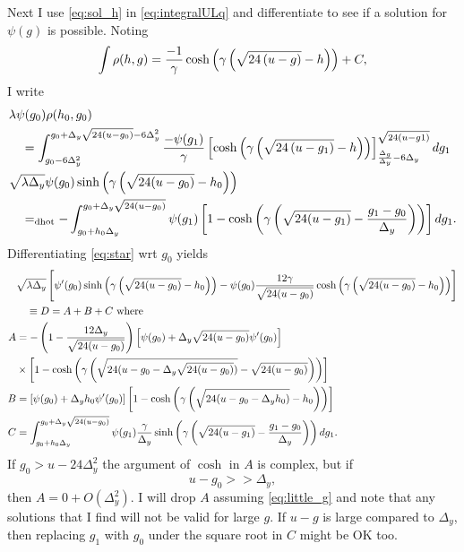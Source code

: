 \documentclass[twocolumn]{article}
\newcommand{\dhot}{=_{\text{dhot}}}
\begin{document}
Next I use \eqref{eq:sol_h} in \eqref{eq:integralULq} and
differentiate to see if a solution for $\psi(g)$ is possible.  Noting
\begin{equation*}
  \int \rho(h,g) = \frac{-1}{\gamma} \cosh \left( \gamma \left(
      \sqrt{24\left(u-g\right)} - h \right) \right) + C,
\end{equation*}
I write
\begin{align}
  & \lambda \psi(g_0)\rho(h_0,g_0) \nonumber\\
  & \quad =\int_{\LgQ}^{\UgQ} \frac{-\psi(g_1) }{\gamma} \left[
    \cosh\left( \gamma \left( \Rad{-g_1} - h \right)\right) \right]_{
    \frac {\Delta_g} {\Delta_y} - 6 \Delta_y}^{\Rad{-g1}} dg_1
  \nonumber \\
  \label{eq:star}
  & \sqrt{\lambda \Delta_y} \psi(g_0) \rhoHG{h_0}{g_0} \nonumber \\
  &\quad \dhot - \int_{\Lg}^{\Ug} \psi(g_1) \left[ 1 - \cosh \left(
      \gamma \left( \sqrt{24(u-g_1)} - \frac{g_1 - g_0}{ \Delta_y}
      \right) \right) \right] dg_1.
\end{align}
Differentiating \eqref{eq:star}  wrt $g_0$ yields
\begin{align}
  & \sqrt{\lambda \Delta_y} \left[ \psi'(g_0) \rhoHG{h_0}{g_0} -
   \psi(g_0)  \frac{12 \gamma}{\sqrt{24(u-g_0)}} \cosh\left( \gamma
      \left(\sqrt{24(u-g_0)} -h_0 \right) \right) \right]  \nonumber\\
  \label{eq:d_star_dg}
  & \quad \equiv D = A + B + C \text{ where} \\
  A &= -\left( 1 - \frac{12 \Delta_y}{\sqrt{24(u-g_0)}} \right)
  \left[ \psi(g_0) + \Delta_y\sqrt{24(u-g_0)} \psi'(g_0) \right]  \nonumber\\
  & \times \left[ 1 - \cosh\left( \gamma \left(\sqrt{24(u-g_0 -
          \Delta_y \sqrt{24(u-g_0)})} - \sqrt{24(u-g_0)} \right)
    \right) \right]  \nonumber\\
  B &= \left[ \psi(g_0) + \Delta_y h_0 \psi'(g_0) \right] \left[ 1 -
    \cosh\left( \gamma \left(\sqrt{24(u-g_0 - \Delta_y h_0)} - h_0
      \right) \right) \right]  \nonumber\\
  C &= \int_{\Lg}^{\Ug} \psi(g_1) \frac{\gamma}{\Delta_y}
  \sinh \left( \gamma \left(
      \sqrt{24(u-g_1)} - \frac{g_1 - g_0 }{ \Delta_y}
    \right) \right) dg_1. \nonumber
\end{align}
If $g_0 > u - 24 \Delta_y^2$ the argument of $\cosh$ in $A$ is
complex, but if
\begin{equation}
  \label{eq:little_g}
  u-g_0 >> \Delta_y,
\end{equation}
then $A = 0 + O(\Delta_y^2)$.  I will drop $A$ assuming
\eqref{eq:little_g} and note that any solutions that I find will not
be valid for large $g$.  If $ u-g $ is large compared to $\Delta_y$,
then replacing $g_1$ with $g_0$ under the square root in $C$ might be
OK too.
\end{document}
